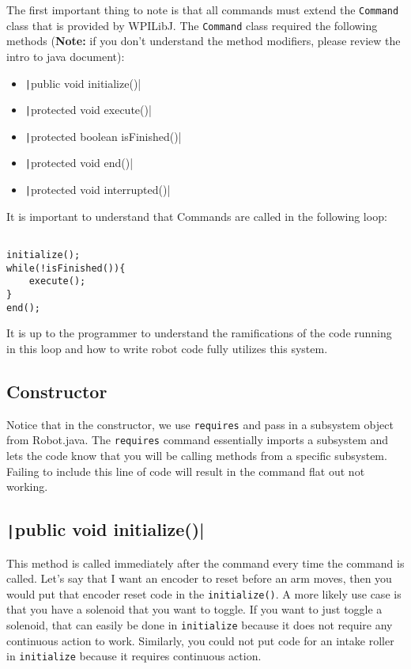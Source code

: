 \documentclass[11pt,fleqn]{article}
\newcommand{\mil}[2][java]{\texttt|#2|}
\begin{document}
The first important thing to note is that all commands must extend the \texttt{Command} class that
is provided by WPILibJ. The \texttt{Command} class required the following methods (\textbf{Note:}
if you don't understand the method modifiers, please review the intro to java document):
\begin{itemize}
    \item
    \mil{public void initialize()}

    \item
    \mil{protected void execute()}

    \item
    \mil{protected boolean isFinished()}

    \item
    \mil{protected void end()}

    \item
    \mil{protected void interrupted()}
\end{itemize}

It is important to understand that Commands are called in the following loop:

\begin{verbatim}

initialize();
while(!isFinished()){
    execute();
}
end();
\end{verbatim}

It is up to the programmer to understand the ramifications of the code running in this loop and how
to write robot code fully utilizes this system. 

\subsection{Constructor}
Notice that in the constructor, we use \texttt{requires} and pass in a subsystem object from
Robot.java. The \texttt{requires} command essentially imports a subsystem and lets the code know
that you will be calling methods from a specific subsystem. Failing to include this line of code
will result in the command flat out not working. 

\subsection{\mil{public void initialize()}}
This method is called immediately after the command every time the command is called. Let's say
that I want an encoder to reset before an arm moves, then you would put that encoder reset code in
the \texttt{initialize()}. A more likely use case is that you have a solenoid that you want to
toggle. If you want to just toggle a solenoid, that can easily be done in \texttt{initialize}
because it does not require any continuous action to work. Similarly, you could not put code for an
intake roller in \texttt{initialize} because it requires continuous action. 
\end{document}
